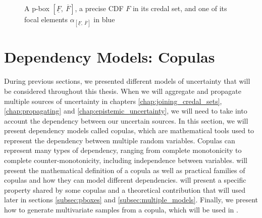 \begin{figure}[!ht]
    \centering
    \caption{A p-box $[\underline{F}, ~\overline{F}]$, a precise CDF $F$ in its credal set, and one of its focal elements $\alpha_{[\underline{F}, ~\overline{F}]}$ in blue}
    \label{fig:p-box}
\end{figure}


\section{Dependency Models: Copulas}\label{sec:copulas}
During previous sections, we presented different models of uncertainty that will be considered throughout this thesis. When we will aggregate and propagate multiple sources of uncertainty in chapters \ref{chap:joining_credal_sets}, \ref{chap:propagating} and \ref{chap:epistemic_uncertainty}, we will need to take into account the dependency between our uncertain sources. In this section, we will present dependency models called copulas, which are mathematical tools used to represent the dependency between multiple random variables. Copulas can represent many types of dependency, ranging from complete monotonicity to complete counter-monotonicity, including independence between variables.  will present the mathematical definition of a copula as well as practical families of copulas and how they can model different dependencies.  will present a specific property shared by some copulas and a theoretical contribution that will used later in sections \ref{subsec:pboxes} and \ref{subsec:multiple_models}. Finally, we present how to generate multivariate samples from a copula, which will be used in .

